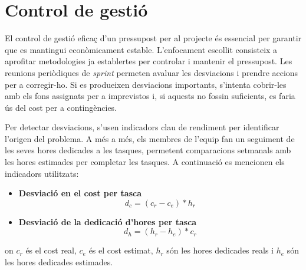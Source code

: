 \section{Control de gestió}
El control de gestió eficaç d'un pressupost per al projecte és essencial per garantir que es mantingui econòmicament estable. L'enfocament escollit consisteix a aprofitar metodologies ja establertes per controlar i mantenir el pressupost. Les reunions periòdiques de \textit{sprint} permeten avaluar les desviacions i prendre accions per a corregir-ho. Si es produeixen desviacions importants, s'intenta cobrir-les amb els fons assignats per a imprevistos i, si aquests no fossin suficients, es faria ús del cost per a contingències.

Per detectar desviacions, s'usen indicadors clau de rendiment per identificar l'origen del problema. A més a més, els membres de l'equip fan un seguiment de les seves hores dedicades a les tasques, permetent comparacions setmanals amb les hores estimades per completar les tasques. A continuació es mencionen els indicadors utilitzats:

\begin{itemize}
    \item \textbf{Desviació en el cost per tasca}
    \[d_c = (c_r - c_e) * h_r\]
    \item \textbf{Desviació de la dedicació d'hores per tasca}
    \[d_h = (h_r - h_e) * c_r\]
\end{itemize}

on $c_r$ és el cost real, $c_e$ és el cost estimat, $h_r$ són les hores dedicades reals i $h_e$ són les hores dedicades estimades.